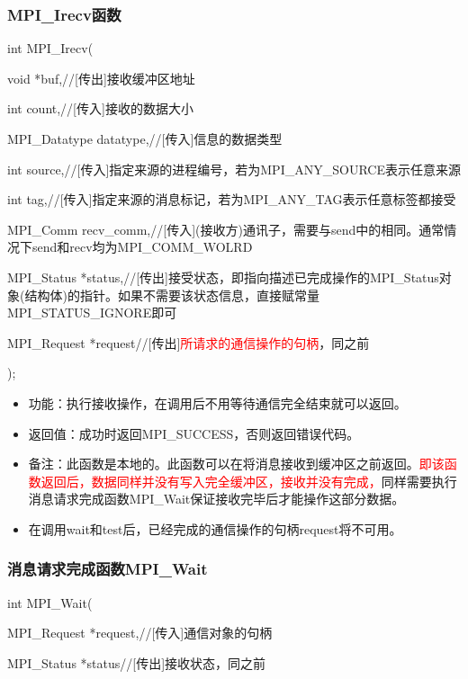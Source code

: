 \documentclass[UTF8]{article}%
\begin{document}
\subsubsection{MPI\_Irecv函数}

int MPI\_Irecv(

    \qquad void            *buf,//[传出]接收缓冲区地址

    \qquad int             count,//[传入]接收的数据大小

    \qquad MPI\_Datatype   datatype,//[传入]信息的数据类型

    \qquad int             source,//[传入]指定来源的进程编号，若为MPI\_ANY\_SOURCE表示任意来源

    \qquad int             tag,//[传入]指定来源的消息标记，若为MPI\_ANY\_TAG表示任意标签都接受

    \qquad MPI\_Comm       recv\_comm,//[传入](接收方)通讯子，需要与send中的相同。通常情况下send和recv均为MPI\_COMM\_WOLRD

    \qquad MPI\_Status     *status,//[传出]接受状态，即指向描述已完成操作的MPI\_Status对象(结构体)的指针。如果不需要该状态信息，直接赋常量MPI\_STATUS\_IGNORE即可

    \qquad MPI\_Request    *request//[传出]\textcolor{red}{所请求的通信操作的句柄}，同之前

);

\begin{itemize}
    \item 功能：执行接收操作，在调用后不用等待通信完全结束就可以返回。
    \item 返回值：成功时返回MPI\_SUCCESS，否则返回错误代码。
    \item 备注：此函数是本地的。此函数可以在将消息接收到缓冲区之前返回。\textcolor{red}{即该函数返回后，数据同样并没有写入完全缓冲区，接收并没有完成，}同样需要执行消息请求完成函数MPI\_Wait保证接收完毕后才能操作这部分数据。
    \item 在调用wait和test后，已经完成的通信操作的句柄request将不可用。
\end{itemize}

\subsubsection{消息请求完成函数MPI\_Wait}

int MPI\_Wait(

    \qquad MPI\_Request *request,//[传入]通信对象的句柄

    \qquad MPI\_Status  *status//[传出]接收状态，同之前
\end{document}
